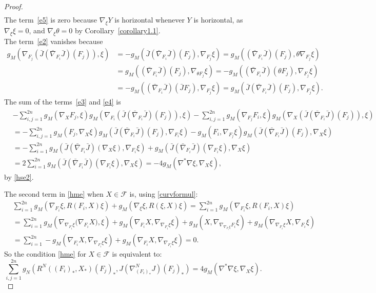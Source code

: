 \documentclass[a4paper,reqno]{amsart}
\theoremstyle{definition}
\theoremstyle{remark}
\theoremstyle{plain}
\numberwithin{equation}{section}
\newcommand{\f}{\mathcal{F}}
\begin{document}
\begin{proof}
\begin{align}
\end{align}
The term~\eqref{e5} is zero because $\nabla_{\xi} Y$ is
horizontal whenever $Y$ is horizontal, as $\nabla_{\xi}\xi =0$,
and $\nabla_{\xi} \theta =0$ by Corollary~\ref{corollary1.1}.\\ 
The term~\eqref{e2} vanishes because
\begin{align*}
    g_M(\nabla_{F_j} (\bar{J}(\bar{\nabla}_{F_i} \bar{J})(F_{j})), \xi)  & = -
     g_M(\bar{J}(\bar{\nabla}_{F_i} \bar{J})(F_{j}),  \nabla_{F_j} \xi)=
     g_M((\bar{\nabla}_{F_i} \bar{J})(F_{j}),  \theta \nabla_{F_j} \xi)
  \\ &= g_M((\bar{\nabla}_{F_i} \bar{J})(F_{j}),  \nabla_{\theta F_j} \xi)
    = -g_M((\bar{\nabla}_{F_i} \bar{J})(\theta F_{j}),  \nabla_{F_j}
       \xi) \\ &= -g_M((\bar{\nabla}_{F_i} \bar{J})(\bar{J} F_{j}),  \nabla_{F_j}
       \xi) = g_M(\bar{J} (\bar{\nabla}_{F_i} \bar{J})(F_{j}),  \nabla_{F_j} \xi).
\end{align*}
The sum of the terms~\eqref{e3} and \eqref{e4} is
\begin{align*}
 & - \sum_{i,j=1}^{2n}g_M(\nabla_{X}  F_j,\xi) g_M(\nabla_{F_i}(\bar{J}(\bar{\nabla}_{F_i} \bar{J})(F_{j})), \xi)
- \sum_{i,j=1}^{2n}g_M(\nabla_{F_j}F_i,\xi) g_M(\nabla_{X} (\bar{J}(\bar{\nabla}_{F_i} \bar{J})(F_{j})), \xi) \\
&=  - \sum_{i,j=1}^{2n}g_M(F_j, \nabla_{X}\xi) g_M(\bar{J}(\bar{\nabla}_{F_i} \bar{J})(F_{j}), \nabla_{F_i}\xi)
- g_M(F_i, \nabla_{F_j}\xi) g_M(\bar{J}(\bar{\nabla}_{F_i} \bar{J})(F_{j}), \nabla_{X}\xi) \\
&=  - \sum_{i=1}^{2n}g_M(\bar{J}(\bar{\nabla}_{F_i} \bar{J})(\nabla_{X}\xi), \nabla_{F_i}\xi)
+ g_M(\bar{J}(\bar{\nabla}_{F_i} \bar{J})(\nabla_{F_i}\xi), \nabla_{X}\xi) \\
&= 2\sum_{i=1}^{2n}g_M(\bar{J}(\bar{\nabla}_{F_i} \bar{J})(\nabla_{F_i}\xi), \nabla_{X}\xi) = -4 g_M(\nabla^* \nabla \xi ,  \nabla_{X}\xi),
\end{align*}
by \eqref{hse2}.


The second term in \eqref{hme} when $X\in \f$ is, using \eqref{curvformul}:
\begin{align*}
   &\sum_{i=1}^{2n}g_M(\nabla_{F_i}\xi , R(F_{i},X)\xi) +  g_M(\nabla_{\xi}\xi , R(\xi,X)\xi)
   = \sum_{i=1}^{2n}g_M(\nabla_{F_i}\xi , R(F_{i},X)\xi)  \\
   &= \sum_{i=1}^{2n}g_M(\nabla_{\nabla_{F_i}\xi} \Big( \nabla_{F_i} X \Big) ,\xi) + 
   g_M(\nabla_{F_i}X , \nabla_{\nabla_{F_i}\xi} \xi) +
    g_M(X , \nabla_{\nabla_{\nabla_{F_i}\xi} F_i} \xi) + 
     g_M(\nabla_{\nabla_{F_i}\xi}X ,\nabla_{F_i}\xi) \\
     &=  \sum_{i=1}^{2n} - g_M(\nabla_{F_i} X  , \nabla_{\nabla_{F_i}\xi} \xi)
     + g_M(\nabla_{F_i}X , \nabla_{\nabla_{F_i}\xi} \xi) =0.
\end{align*}
So the condition \eqref{hme} for $X\in \f$ is equivalent to:
$$
\sum_{i,j=1}^{2n} g_N(  R^N((F_i)_*, X_* )(F_j)_* ,  J(\nabla^N_{(F_i)_*}  J)(F_{j})_*) = 4 g_M(\nabla^* \nabla \xi ,  \nabla_{X}\xi).
$$



\end{proof}
\end{document}
